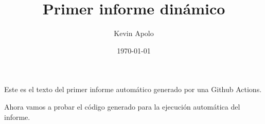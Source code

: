 \documentclass[12pt, a4paper]{book}
\title{Primer informe dinámico}
\author{Kevin Apolo}
\date{\today}
\begin{document}
\maketitle

Este es el texto del primer informe automático generado por una Github Actions. \newline

Ahora vamos a probar el código generado para la ejecución automática del informe.

\end{document}
